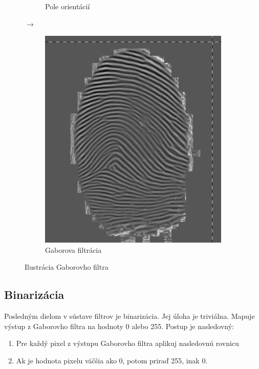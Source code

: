 \documentclass[11pt,a4paper]{article}
\begin{document}
\begin{figure}[h!]
\begin{subfigure}{0.3\textwidth}
		\caption{Pole orientácií}
	\end{subfigure}%
	{\LARGE$\xrightarrow{}$}
	\begin{subfigure}{0.3\textwidth}
		\centering
		\includegraphics[width=.95\linewidth]{images/Screenshot_12}
		\caption{Gaborova filtrácia}
	\end{subfigure}%
	\caption{Ilustrácia Gaborovho filtra}\label{fig:8}
\end{figure}

\subsection*{Binarizácia}
Posledným dielom v sústave filtrov je binarizácia. Jej úloha je triviálna. Mapuje výstup z Gaborovho filtra na hodnoty 0 alebo 255. Postup je nasledovný:
\begin{enumerate}
	\item Pre každý pixel z výstupu Gaborovho filtra aplikuj nasledovnú rovnicu
	\item Ak je hodnota pixelu väčšia ako 0, potom priraď 255, inak 0.
\end{enumerate}
\end{document}

